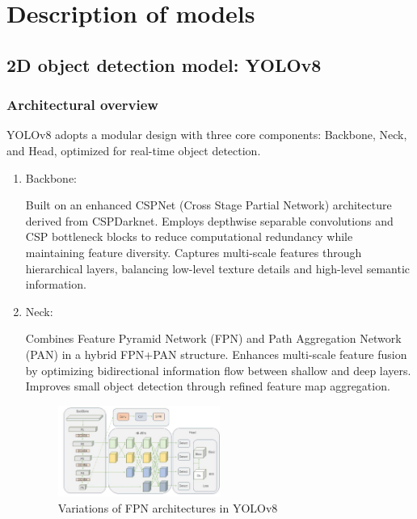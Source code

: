 \documentclass{article}
\begin{document}
\section{Description of models}
\label{sec:models}
\subsection{2D object detection model: YOLOv8}
\subsubsection{Architectural overview}
YOLOv8 adopts a modular design with three core components: Backbone, Neck, and Head, optimized for real-time object detection.

\begin{enumerate}
    \item Backbone:    

    Built on an enhanced CSPNet (Cross Stage Partial Network)\cite{wangCSPNetNewBackbone2019} architecture derived from CSPDarknet\cite{bochkovskiyYOLOv4OptimalSpeed2020a}.
Employs depthwise separable convolutions and CSP bottleneck blocks to reduce computational redundancy while maintaining feature diversity.
Captures multi-scale features through hierarchical layers, balancing low-level texture details and high-level semantic information.
    
    \item Neck:
    
    Combines Feature Pyramid Network (FPN)\cite{Lin2016FeaturePN} and Path Aggregation Network (PAN)\cite{Liu2018PathAN} in a hybrid FPN+PAN structure.
Enhances multi-scale feature fusion by optimizing bidirectional information flow between shallow and deep layers.
Improves small object detection through refined feature map aggregation.

\begin{figure}[htb]
    \centering
    \includegraphics[width=0.5\textwidth]{images/Variations of FPN architectures in YOLOv8.jpg}
    \caption{Variations of FPN architectures in YOLOv8}
    \label{fig:fpn_architectures}
\end{figure}


\end{enumerate}
\end{document}
